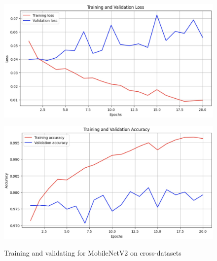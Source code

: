 \documentclass[final]{cvpr}
\begin{document}

\begin{figure}[t]
\centering
\begin{minipage}{0.45\linewidth}
   \includegraphics[width=\linewidth]{images/mobilenetv2_cd_loss.jpg}
   \label{fig:image1}
\end{minipage}
\hfill
\begin{minipage}{0.45\linewidth}
   \includegraphics[width=\linewidth]{images/mobilenetv2_cd_acc.jpg}
   \label{fig:image2}
\end{minipage}
\caption{Training and validating for MobileNetV2 on cross-datasets}
\label{fig:mobilenetv2_cd}
\end{figure}
\end{document}
